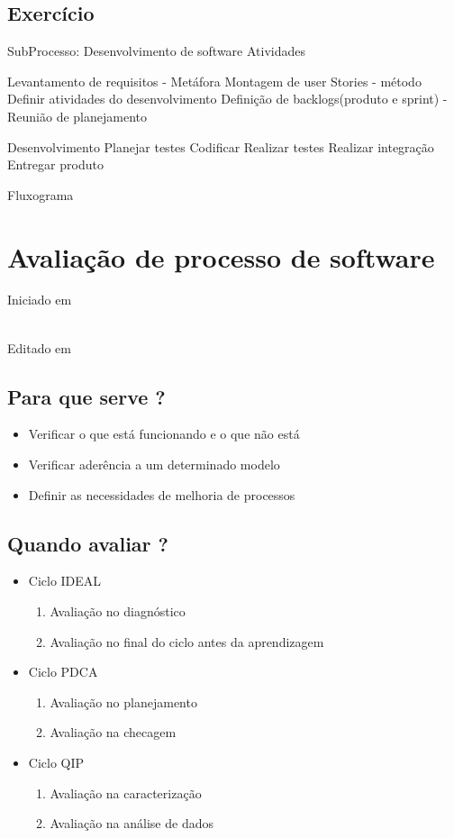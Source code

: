 \documentclass{article}
\begin{document}
\subsection{Exercício}

SubProcesso: Desenvolvimento de software
	Atividades

		Levantamento de requisitos - Metáfora
			Montagem de user Stories - método
		Definir atividades do desenvolvimento		
			Definição de backlogs(produto e sprint) - Reunião de planejamento
		
	Desenvolvimento
		Planejar testes
		Codificar
		Realizar testes
		Realizar integração
		Entregar produto
			
		Fluxograma
				
						
\section{Avaliação de processo de software} 
Iniciado em \date{23 de Abril de 2014}\\
Editado em \date{13 de Outubro de 2014}

\subsection{Para que serve ?}
	\begin{itemize}
	\item Verificar o que está funcionando e o que não está
	\item Verificar aderência a um determinado modelo
	\item Definir as necessidades de melhoria de processos	
	\end{itemize}	

\subsection{Quando avaliar ?}
	\begin{itemize}
	\item Ciclo IDEAL
		\begin{enumerate}
		\item Avaliação no diagnóstico
		\item Avaliação no final do ciclo antes da aprendizagem
		\end{enumerate}
	\item Ciclo PDCA
		\begin{enumerate}
		\item Avaliação no planejamento
		\item Avaliação na checagem
		\end{enumerate}
	\item Ciclo QIP
		\begin{enumerate}
		\item Avaliação na caracterização
		\item Avaliação na análise de dados
		\end{enumerate}
	\end{itemize}
	
\end{document}
